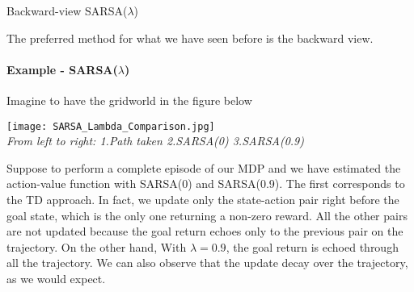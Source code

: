 \documentclass[main.tex]{subfiles}
\begin{document}
\begin{algorithm}[H]
\SetAlgoLined
{}

\caption{Backward-view SARSA($\lambda$)}
\end{algorithm}
The preferred method for what we have seen before is the backward view.

\paragraph{Example - SARSA($\lambda$)} Imagine to have the gridworld in the figure below
\begin{center}
    \texttt{[image: SARSA\_Lambda\_Comparison.jpg]} \\
    \textit{From left to right: 1.Path taken 2.SARSA(0) 3.SARSA(0.9)}
\end{center}
Suppose to perform a complete episode of our MDP and we have estimated the action-value function with SARSA(0) and SARSA(0.9). The first corresponds to the TD approach. In fact, we update only the state-action pair right before the goal state, which is the only one returning a non-zero reward. All the other pairs are not updated because the goal return echoes only to the previous pair on the trajectory. On the other hand, With $\lambda=0.9$, the goal return is echoed through all the trajectory. We can also observe that the update decay over the trajectory, as we would expect.
\end{document}

